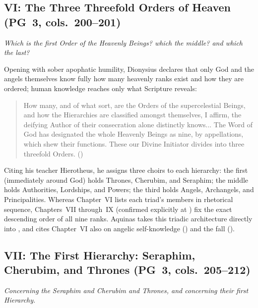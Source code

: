 \subsection{VI: The Three Threefold Orders of Heaven (PG~3, cols.~200--201)}
\label{sec:ch-vi}
\emph{Which is the first Order of the Heavenly Beings? which the middle? and which the last?}

Opening with sober apophatic humility, Dionysius declares that only God and the angels themselves know fully how many heavenly ranks exist and how they are ordered; human knowledge reaches only what Scripture reveals:
\begin{quotation}
How many, and of what sort, are the Orders of the supercelestial Beings, and how the Hierarchies are classified amongst themselves, I affirm, the deifying Author of their consecration alone distinctly knows... The Word of God has designated the whole Heavenly Beings as nine, by appellations, which shew their functions. These our Divine Initiator divides into three threefold Orders. ()
\end{quotation}
Citing his teacher Hierotheus, he assigns three choirs to each hierarchy: the first (immediately around God) holds Thrones, Cherubim, and Seraphim; the middle holds Authorities, Lordships, and Powers; the third holds Angels, Archangels, and Principalities. Whereas Chapter~VI lists each triad's members in rhetorical sequence, Chapters~VII through~IX (confirmed explicitly at ) fix the exact descending order of all nine ranks. Aquinas takes this triadic architecture directly into , and cites Chapter~VI also on angelic self-knowledge () and the fall ().

\subsection{VII: The First Hierarchy: Seraphim, Cherubim, and Thrones (PG~3, cols.~205--212)}
\label{sec:ch-vii}
\emph{Concerning the Seraphim and Cherubim and Thrones, and concerning their first Hierarchy.}

